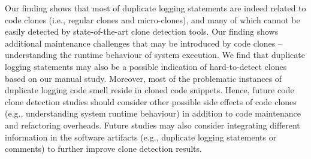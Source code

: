  Our finding shows that most of duplicate logging statements are indeed related to code clones (i.e., regular clones and micro-clones), and many of which cannot be easily detected by state-of-the-art clone detection tools. Our finding shows additional maintenance challenges that may be introduced by code clones -- understanding the runtime behaviour of system execution. We find that duplicate logging statements may also be a possible indication of hard-to-detect clones based on our manual study. Moreover, most of the problematic instances of duplicate logging code smell reside in cloned code snippets. Hence, future code clone detection studies should consider other possible side effects of code clones (e.g., understanding system runtime behaviour) in addition to code maintenance and refactoring overheads. Future studies may also consider integrating different information in the software artifacts (e.g., duplicate logging statements or comments) to further improve clone detection results. %





